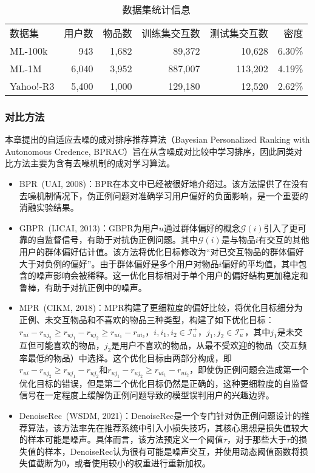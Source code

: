 \begin{table}[t]
	\centering
	\caption{数据集统计信息}\label{Table:Dataset}
	\begin{tabular}{lrrrrr}
		\toprule[0.5pt]
		数据集           & 用户数   & 物品数   & 训练集交互数  &测试集交互数& 密度  \\ \cline{1-6}
		ML-100k   &   943    &  1,682   &    89,372	   & 10,628&  6.30\%	\\
		ML-1M    &   6,040  &  3,952   &   887,007      & 113,202 &4.19\%  \\
		Yahoo!-R3       &   5,400  &  1,000   &   129,180      & 12,520&2.62\%  \\
		\bottomrule[0.5pt]
	\end{tabular}%
\end{table}

\subsubsection{对比方法}
本章提出的自适应去噪的成对排序推荐算法（Bayesian Personalized Ranking with Autonomous Credence, BPRAC）旨在从含噪成对比较中学习排序，因此同类对比方法主要为含有去噪机制的成对学习算法。
\begin{itemize}
\item BPR~\cite{Steffen:2009:UAI}(UAI, 2008)：BPR在本文中已经被很好地介绍过。该方法提供了在没有去噪机制情况下，伪正例问题对准确学习用户偏好的负面影响，是一个重要的消融实验结果。
\item GBPR~\cite{Weike:2013:IJCAI}(IJCAI, 2013)：GBPR为用户$u$通过群体偏好的概念$\mathcal{G}(i)$引入了更可靠的自监督信号，有助于对抗伪正例问题。其中$\mathcal{G}(i)$是与物品$i$有交互的其他用户的群体偏好估计值。该方法将优化目标修改为“对已交互物品的群体偏好大于对负例的偏好”。由于群体偏好是多个用户对物品$i$偏好的平均值，其中包含的噪声影响会被稀释。这一优化目标相对于单个用户的偏好结构更加稳定和鲁棒，有助于对抗正例中的噪声。

\item MPR~\cite{Yu:2018:CIKM}(CIKM, 2018)：MPR构建了更细粒度的偏好比较，将优化目标细分为正例、未交互物品和不喜欢的物品三种类型，构建了如下优化目标：$r_{ui} - r_{uj_2} \geq r_{uj_1} - r_{uj_2} \geq r_{ui_1} - r_{ui_2}$，$i,i_1,i_2 \in \mathcal{I}_u^+$，$j_1, j_2 \in \mathcal{I}_u^-$，其中$j_1$是未交互但可能喜欢的物品，$j_2$是用户不喜欢的物品，从最不受欢迎的物品（交互频率最低的物品）中选择。这个优化目标由两部分构成，即$r_{ui} - r_{uj_2} \geq r_{uj_1} - r_{uj_2} $和$ r_{uj_1} - r_{uj_2} \geq r_{ui_1} - r_{ui_2}$，即使伪正例问题会造成第一个优化目标的错误，但是第二个优化目标仍然是正确的，这种更细粒度的自监督信号在一定程度上缓解伪正例问题导致的模型误判用户的兴趣边界。

\item DenoiseRec~\cite{Wang:2021:WSDM}(WSDM, 2021)：DenoiseRec是一个专门针对伪正例问题设计的推荐算法，该方法率先在推荐系统中引入小损失技巧，其核心思想是损失值较大的样本可能是噪声。具体而言，该方法预定义一个阈值$\tau$，对于那些大于$\tau$的损失值的样本，DenoiseRec认为很有可能是噪声交互，并使用动态阈值函数将损失值截断为0，或者使用较小的权重进行重新加权。
\end{itemize}

